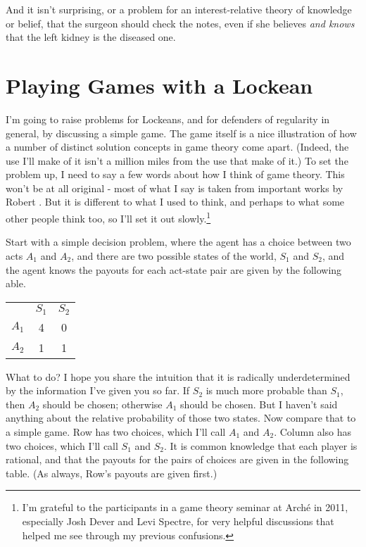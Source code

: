 \noindent And it isn't surprising, or a problem for an interest-relative theory of knowledge or belief, that the surgeon should check the notes, even if she believes \textit{and knows} that the left kidney is the diseased one.
 
\section{Playing Games with a Lockean}

I'm going to raise problems for Lockeans, and for defenders of regularity in general, by discussing a simple game. The game itself is a nice illustration of how a number of distinct solution concepts in game theory come apart. (Indeed, the use I'll make of it isn't a million miles from the use that  \cite{KohlbergMertens1986} make of it.) To set the problem up, I need to say a few words about how I think of game theory. This won't be at all original - most of what I say is taken from important works by Robert \cite{Stalnaker1994, Stalnaker1996, Stalnaker1998, Stalnaker1999}. But it is different to what I used to think, and perhaps to what some other people think too, so I'll set it out slowly.\footnote{I'm grateful to the participants in a game theory seminar at Arch\'e in 2011, especially Josh Dever and Levi Spectre, for very helpful discussions that helped me see through my previous confusions.}

Start with a simple decision problem, where the agent has a choice between two acts $A_1$ and $A_2$, and there are two possible states of the world, $S_1$ and $S_2$, and the agent knows the payouts for each act-state pair are given by the following able.

\begin{center}
\begin{tabular}{r c c}
 & $S_1$ & $S_2$ \\
$A_1$ & 4 & 0 \\
$A_2$ & 1 & 1 
\end{tabular}
\end{center}

\noindent What to do? I hope you share the intuition that it is radically underdetermined by the information I've given you so far. If $S_2$ is much more probable than $S_1$, then $A_2$ should be chosen; otherwise $A_1$ should be chosen. But I haven't said anything about the relative probability of those two states. Now compare that to a simple game. Row has two choices, which I'll call $A_1$ and $A_2$. Column also has two choices, which I'll call $S_1$ and $S_2$. It is common knowledge that each player is rational, and that the payouts for the pairs of choices are given in the following table. (As always, Row's payouts are given first.)


